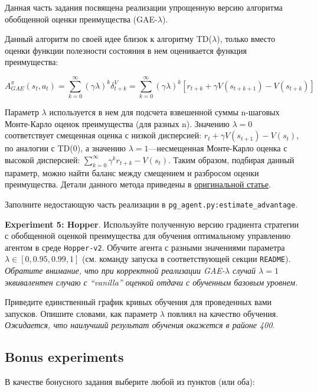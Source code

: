 \documentclass[12pt, oneside]{article}
\begin{document}
Данная часть задания посвящена реализации упрощенную версию алгоритма обобщенной оценки преимущества (GAE-$\lambda$).

Данный алгоритм по своей идее близок к алгоритму TD($\lambda$), только вместо оценки функции полезности состояния в нем оценивается функция преимущества:

\begin{equation}
    A_{GAE}^\pi (s_t, a_t) = \sum_{k=0}^{\infty} {(\gamma \lambda)^k \delta_{t+k}^V} = \sum_{k=0}^{\infty} {(\gamma \lambda)^k [r_{t+k} + \gamma V(s_{t+k+1}) - V(s_{t+k})]}
\end{equation}

\noindent
Параметр $\lambda$ используется в нем для подсчета взвешенной суммы n-шаговых Монте-Карло оценок преимущества (для разных n). Значению $\lambda = 0$ соответствует смещенная оценка с низкой дисперсией: $r_t + \gamma V(s_{t+1}) - V(s_t)$, по аналогии с TD(0), а значению $\lambda = 1$---несмещенная Монте-Карло оценка с высокой дисперсией: $\sum_{k=0}^{\infty} {\gamma^k r_{t+k}} - V(s_t)$. Таким образом, подбирая данный параметр, можно найти баланс между смещением и разбросом оценки преимущества. Детали данного метода приведены в \href{https://arxiv.org/pdf/1506.02438.pdf}{оригинальной статье}.

Заполните недостающую часть реализации в \verb|pg_agent.py:estimate_advantage|.

\textbf{Experiment 5: Hopper}. Используйте полученную версию градиента стратегии с обобщенной оценкой преимущества для обучения оптимальному управлению агентом в среде \verb|Hopper-v2|. Обучите агента с разными значениями параметра $\lambda \in [0, 0.95, 0.99, 1]$ (см. команду запуска в соответствующей секции \verb|README|). \textit{Обратите внимание, что при корректной реализации GAE-$\lambda$ случай $\lambda = 1$ эквивалентен случаю с ``vanilla'' оценкой отдачи с обученным базовым уровнем.}

Приведите единственный график кривых обучения для проведенных вами запусков. Опишите словами, как параметр $\lambda$ повлиял на качество обучения. \textit{Ожидается, что наилучший результат обучения окажется в районе 400}.

\subsection{Bonus experiments}

В качестве бонусного задания выберите любой из пунктов (или оба):
\end{document}
